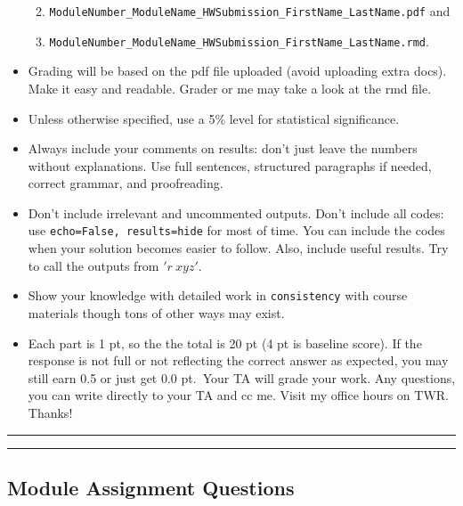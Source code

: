 \documentclass[
]{article}
\providecommand{\tightlist}{%
  \setlength{\itemsep}{0pt}\setlength{\parskip}{0pt}}
\begin{document}
\begin{itemize}
  \begin{enumerate}
  \def\labelenumi{\arabic{enumi})}
  \tightlist
  \item
    \texttt{ModuleNumber\_ModuleName\_HWSubmission\_FirstName\_LastName.pdf}
    and
  \item
    \texttt{ModuleNumber\_ModuleName\_HWSubmission\_FirstName\_LastName.rmd}.
  \end{enumerate}
\item
  Grading will be based on the pdf file uploaded (avoid uploading extra
  docs). Make it easy and readable. Grader or me may take a look at the
  rmd file.
\item
  Unless otherwise specified, use a 5\% level for statistical
  significance.
\item
  Always include your comments on results: don't just leave the numbers
  without explanations. Use full sentences, structured paragraphs if
  needed, correct grammar, and proofreading.
\item
  Don't include irrelevant and uncommented outputs. Don't include all
  codes: use
  \texttt{echo=False,\ results=\textquotesingle{}hide\textquotesingle{}}
  for most of time. You can include the codes when your solution becomes
  easier to follow. Also, include useful results. Try to call the
  outputs from \('r~xyz'\).
\item
  Show your knowledge with detailed work in \texttt{consistency} with
  course materials though tons of other ways may exist.
\item
  Each part is 1 pt, so the the total is 20 pt (4 pt is baseline score).
  If the response is not full or not reflecting the correct answer as
  expected, you may still earn 0.5 or just get 0.0 pt.~Your TA will
  grade your work. Any questions, you can write directly to your TA and
  cc me. Visit my office hours on TWR. Thanks!
\end{itemize}

\begin{center}\rule{0.5\linewidth}{0.5pt}\end{center}

\newpage{}

\begin{center}\rule{0.5\linewidth}{0.5pt}\end{center}

\hypertarget{module-assignment-questions}{%
\subsection{Module Assignment
Questions}\label{module-assignment-questions}}
\end{document}
